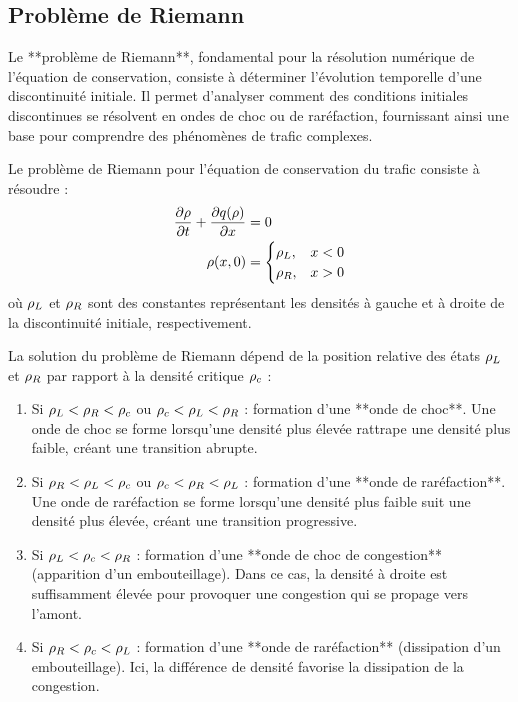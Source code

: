 \subsection{Problème de Riemann}
\label{subsec:riemann}

Le **problème de Riemann**, fondamental pour la résolution numérique de l'équation de conservation, consiste à déterminer l'évolution temporelle d'une discontinuité initiale. Il permet d'analyser comment des conditions initiales discontinues se résolvent en ondes de choc ou de raréfaction, fournissant ainsi une base pour comprendre des phénomènes de trafic complexes.

\begin{definition}
Le problème de Riemann pour l'équation de conservation du trafic consiste à résoudre :
\begin{align}
\frac{\partial \rho}{\partial t} + \frac{\partial q(\rho)}{\partial x} &= 0\\
\rho(x,0) &= 
\begin{cases}
\rho_L, & x < 0\\
\rho_R, & x > 0
\end{cases}
\end{align}
où $\rho_L$ et $\rho_R$ sont des constantes représentant les densités à gauche et à droite de la discontinuité initiale, respectivement.
\end{definition}

La solution du problème de Riemann dépend de la position relative des états $\rho_L$ et $\rho_R$ par rapport à la densité critique $\rho_c$ :

\begin{enumerate}
    \item Si $\rho_L < \rho_R < \rho_c$ ou $\rho_c < \rho_L < \rho_R$ : formation d'une **onde de choc**. Une onde de choc se forme lorsqu'une densité plus élevée rattrape une densité plus faible, créant une transition abrupte.
    \item Si $\rho_R < \rho_L < \rho_c$ ou $\rho_c < \rho_R < \rho_L$ : formation d'une **onde de raréfaction**. Une onde de raréfaction se forme lorsqu'une densité plus faible suit une densité plus élevée, créant une transition progressive.
    \item Si $\rho_L < \rho_c < \rho_R$ : formation d'une **onde de choc de congestion** (apparition d'un embouteillage). Dans ce cas, la densité à droite est suffisamment élevée pour provoquer une congestion qui se propage vers l'amont.
    \item Si $\rho_R < \rho_c < \rho_L$ : formation d'une **onde de raréfaction** (dissipation d'un embouteillage). Ici, la différence de densité favorise la dissipation de la congestion.
\end{enumerate}

